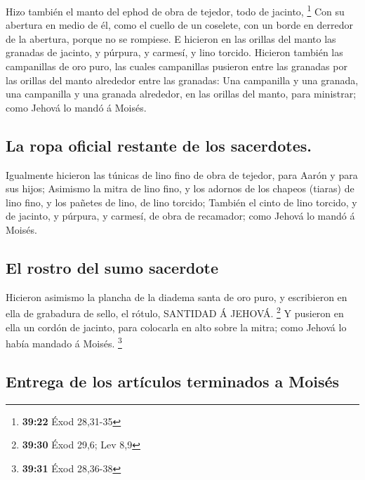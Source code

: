  Hizo también el manto del ephod de obra de tejedor, todo
de jacinto, \footnote{\textbf{39:22} Éxod 28,31-35}  Con su
abertura en medio de él, como el cuello de un coselete, con un borde en
derredor de la abertura, porque no se rompiese.  E hicieron
en las orillas del manto las granadas de jacinto, y púrpura, y carmesí,
y lino torcido.  Hicieron también las campanillas de oro
puro, las cuales campanillas pusieron entre las granadas por las orillas
del manto alrededor entre las granadas:  Una campanilla y
una granada, una campanilla y una granada alrededor, en las orillas del
manto, para ministrar; como Jehová lo mandó á Moisés.

\hypertarget{la-ropa-oficial-restante-de-los-sacerdotes.}{%
\subsection{La ropa oficial restante de los
sacerdotes.}\label{la-ropa-oficial-restante-de-los-sacerdotes.}}

 Igualmente hicieron las túnicas de lino fino de obra de
tejedor, para Aarón y para sus hijos;  Asimismo la mitra de
lino fino, y los adornos de los chapeos (tiaras) de lino fino, y los
pañetes de lino, de lino torcido;  También el cinto de lino
torcido, y de jacinto, y púrpura, y carmesí, de obra de recamador; como
Jehová lo mandó á Moisés.

\hypertarget{el-rostro-del-sumo-sacerdote}{%
\subsection{El rostro del sumo
sacerdote}\label{el-rostro-del-sumo-sacerdote}}

 Hicieron asimismo la plancha de la diadema santa de oro
puro, y escribieron en ella de grabadura de sello, el rótulo, SANTIDAD Á
JEHOVÁ. \footnote{\textbf{39:30} Éxod 29,6; Lev 8,9}  Y
pusieron en ella un cordón de jacinto, para colocarla en alto sobre la
mitra; como Jehová lo había mandado á Moisés. \footnote{\textbf{39:31}
  Éxod 28,36-38}

\hypertarget{entrega-de-los-artuxedculos-terminados-a-moisuxe9s}{%
\subsection{Entrega de los artículos terminados a
Moisés}\label{entrega-de-los-artuxedculos-terminados-a-moisuxe9s}}

